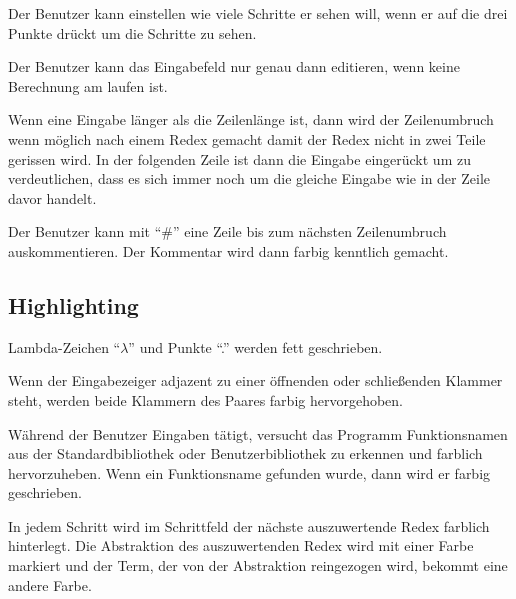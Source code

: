 \documentclass[parskip=full,11pt,twoside]{scrartcl}
\begin{document}
Der Benutzer kann einstellen wie viele Schritte er sehen will, wenn er auf die drei Punkte drückt um die Schritte zu sehen.

Der Benutzer kann das Eingabefeld nur genau dann editieren, wenn keine Berechnung am laufen ist.

Wenn eine Eingabe länger als die Zeilenlänge ist, dann wird der Zeilenumbruch wenn möglich nach einem Redex gemacht damit der Redex nicht in zwei Teile gerissen wird. In der folgenden Zeile ist dann
die Eingabe eingerückt um zu verdeutlichen, dass es sich immer noch um die gleiche Eingabe wie in der Zeile davor handelt.

Der Benutzer kann mit \enquote{\#} eine Zeile bis zum nächsten Zeilenumbruch auskommentieren.
Der Kommentar wird dann farbig kenntlich gemacht.

\subsection{Highlighting}

Lambda-Zeichen \enquote{$\lambda$} und Punkte \enquote{.} werden fett geschrieben.

Wenn der Eingabezeiger adjazent zu einer öffnenden oder schließenden Klammer steht, werden beide Klammern des Paares farbig hervorgehoben.

Während der Benutzer Eingaben tätigt, versucht das Programm Funktionsnamen aus der Standardbibliothek oder Benutzerbibliothek zu erkennen und farblich hervorzuheben. Wenn ein Funktionsname gefunden wurde, dann wird er farbig geschrieben.

In jedem Schritt wird im Schrittfeld der nächste auszuwertende Redex farblich hinterlegt.
Die Abstraktion des auszuwertenden Redex wird mit einer Farbe markiert und der Term, der von der Abstraktion reingezogen wird, bekommt eine andere Farbe.
\end{document}
